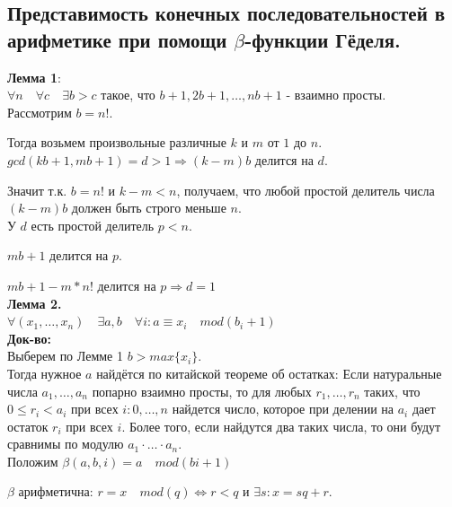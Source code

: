 \subsection{Представимость конечных последовательностей в арифметике при помощи $\beta$-функции Гёделя.}

\textbf{Лемма 1}:\\

$\forall n \quad \forall c \quad \exists b > c$ такое, что $b + 1,  2b + 1, \dotsc, nb + 1$ - взаимно просты.\\

Рассмотрим $b = n!$.

Тогда возьмем произвольные различные $k$ и $m$ от $1$ до $n$. $gcd(kb + 1, mb + 1) = d > 1 \Rightarrow (k - m)b$ делится на $d$.

Значит т.к. $b = n!$ и $k - m < n$, получаем, что любой простой делитель числа $(k - m)b$ должен быть строго меньше $n$.\\

У $d$ есть простой делитель $p < n$.

$mb + 1$ делится на $p$.

$mb + 1 - m*n!$ делится на $p \Rightarrow d = 1$ 
\\

\textbf{Лемма 2.}\\

$\forall (x_1, \dotsc, x_n) \quad\exists a, b \quad \forall i : a \equiv x_i \quad mod (b_i + 1)$\\

\textbf{Док-во:}\\

Выберем по Лемме 1 $b > max\{x_i\}$.\\

Тогда нужное $a$ найдётся по китайской теореме об остатках: Если натуральные числа $a_1, \dotsc, a_n$  попарно взаимно просты, то для любых $r_1, \dotsc, r_n$ таких, что $0 \leq r_i < a_i$ при всех $i : 0, \dotsc, n$ найдется число, которое при делении на $a_i$ дает остаток $r_i$ при всех $i$. Более того, если найдутся два таких числа, то они будут сравнимы по модулю $a_1 \cdot \dotsc \cdot a_n$.\\

Положим $\beta(a, b, i) = a \quad mod (bi + 1)$

$\beta$ арифметична: $r = x \quad mod(q) \Leftrightarrow r < q$ и $\exists s: x = sq + r$.